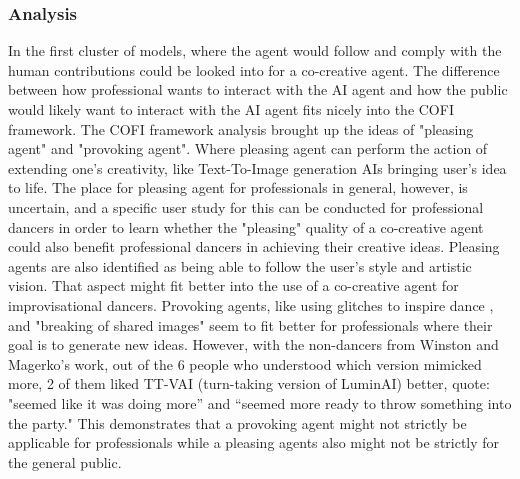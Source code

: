 \documentclass[final,5p,times,twocolumn,authoryear]{article}
\begin{document}
\subsubsection{Analysis}
In the first cluster of models, where the agent would follow and comply
with the human contributions could be looked into for a co-creative agent.
The difference between how professional wants to interact with the AI
agent and how the public would likely want to interact with the AI agent
fits nicely into the COFI framework. The COFI framework analysis brought
up the ideas of "pleasing agent" and
"provoking agent". Where pleasing agent can perform the action of
extending one's creativity, like Text-To-Image generation AIs bringing user's idea to life. The
place for pleasing agent for professionals in general, however, is
uncertain, and a specific user study for this can be conducted for
professional dancers in order to learn whether the "pleasing" quality of
a co-creative agent could also benefit professional dancers in achieving
their creative ideas. Pleasing agents are also identified as being able
to follow the user's style and artistic vision. That aspect might
fit better into the use of a co-creative agent for improvisational dancers.
Provoking agents, like using glitches to inspire
dance \cite{Wallace2023}, and "breaking of shared images" seem to fit better for professionals where
their goal is to generate new ideas. However, with the non-dancers from
Winston and Magerko's work, out of the 6 people who understood which
version mimicked more, 2 of them liked TT-VAI (turn-taking version
of LuminAI) better, quote: "seemed like it was doing more” and “seemed
more ready to throw something into the party." This demonstrates that
a provoking agent might not strictly be applicable for professionals
while a pleasing agents also might not be strictly for the general
public.
\end{document}
